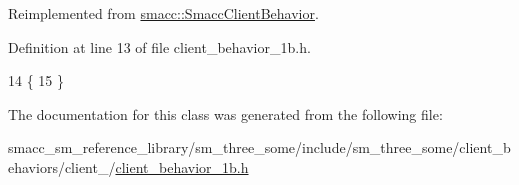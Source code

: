 Reimplemented from \hyperlink{classsmacc_1_1SmaccClientBehavior_a7962382f93987c720ad432fef55b123f}{smacc\+::\+Smacc\+Client\+Behavior}.



Definition at line 13 of file client\+\_\+behavior\+\_\+1b.\+h.


\begin{DoxyCode}
14     \{
15     \}
\end{DoxyCode}


The documentation for this class was generated from the following file\+:\begin{DoxyCompactItemize}
\item 
smacc\+\_\+sm\+\_\+reference\+\_\+library/sm\+\_\+three\+\_\+some/include/sm\+\_\+three\+\_\+some/client\+\_\+behaviors/client\+\_/\hyperlink{client__behavior__1b_8h}{client\+\_\+behavior\+\_\+1b.\+h}\end{DoxyCompactItemize}
